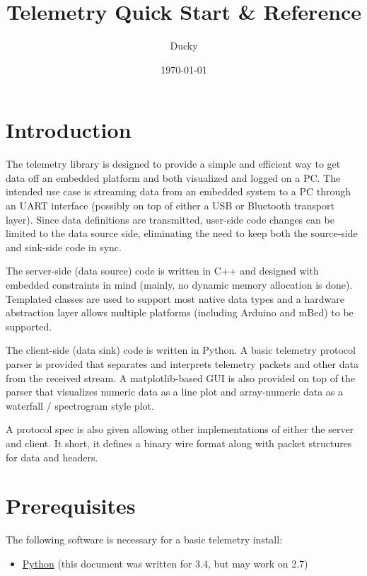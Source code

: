 \documentclass[11pt]{article}
\title{\textbf{Telemetry Quick Start \& Reference}}
\author{Ducky}
\date{\today}
\begin{document}
\maketitle

\section{Introduction}
The telemetry library is designed to provide a simple and efficient way to get data off an embedded platform and both visualized and logged on a PC. The intended use case is streaming data from an embedded system to a PC through an UART interface (possibly on top of either a USB or Bluetooth transport layer). Since data definitions are transmitted, user-side code changes can be limited to the data source side, eliminating the need to keep both the source-side and sink-side code in sync.

The server-side (data source) code is written in C++ and designed with embedded constraints in mind (mainly, no dynamic memory allocation is done). Templated classes are used to support most native data types and a hardware abstraction layer allows multiple platforms (including Arduino and mBed) to be supported.

The client-side (data sink) code is written in Python. A basic telemetry protocol parser is provided that separates and interprets telemetry packets and other data from the received stream. A matplotlib-based GUI is also provided on top of the parser that visualizes numeric data as a line plot and array-numeric data as a waterfall / spectrogram style plot.

A protocol spec is also given allowing other implementations of either the server and client. It short, it defines a binary wire format along with packet structures for data and headers.

\section{Prerequisites}
The following software is necessary for a basic telemetry install:
\begin{itemize}
  \item \href{https://www.python.org/downloads/}{Python} (this document was written for 3.4, but may work on 2.7)
\end{itemize}
\end{document}
